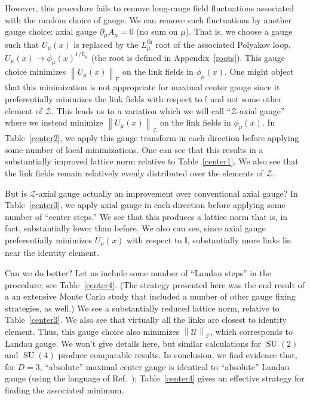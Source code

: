 \documentclass[preprint,aps,prd]{revtex4-2}
\newcommand{\zentrum}{\mathcal{Z}}       %
\newcommand{\config}{\mathcal{U}}
\DeclareMathOperator{\SU}{SU}
\newcommand\fnorm[1]{\left\lVert #1 \right\rVert_\mathrm{F}}
\begin{document}
However, this procedure fails to remove long-range field fluctuations
associated with the random choice of gauge.  We can remove
such fluctuations by another gauge choice:  axial gauge
$\partial_\mu A_\mu = 0$ (no sum on $\mu$).
That is, we choose a gauge such that $U_\mu(x)$ is replaced
by the $L_\mu^\mathrm{th}$ root of the associated Polyakov loop,
$U_\mu(x) \to \phi_\mu(x)^{1/L_\mu}$ (the root is defined in
Appendix~\ref{roots}).
This gauge choice minimizes $\fnorm{U_\mu(x)}$
on the link fields in $\phi_\mu(x)$.  One might
object that this minimization is not appropriate for maximal center gauge
since it preferentially minimizes the link fields
with respect to $\mathbb{I}$ and not some other element of $\zentrum$.
This leads us to a variation which we will call ``$\zentrum$-axial gauge''
where we instead minimize $\left\lVert U_\mu(x) \right\rVert_\zentrum$
on the link fields in $\phi_\mu(x)$.  In Table~\ref{center2},
we apply this gauge transform in each direction before applying
some number of local minimizations.  One can see that this
results in a substantially improved lattice norm relative to
Table~\ref{center1}.  We also see that the link fields
remain relatively evenly distributed over the elements of $\zentrum$.

But is $\zentrum$-axial gauge actually an improvement over
conventional axial gauge?
In Table~\ref{center3}, we apply axial gauge in each
direction before applying some number of ``center steps.''
We see that this produces a lattice norm that is, in fact,
substantially lower than before.  We also can see, since
axial gauge preferentially minimizes $U_\mu(x)$ with
respect to $\mathbb{I}$, substantially more links lie near
the identity element.

Can we do better? Let us include some number of ``Landau steps''
in the procedure; see Table~\ref{center4}.  (The strategy presented
here was the end result of a an extensive Monte Carlo study that
included a number of other gauge fixing strategies, as well.)
We see a substantially reduced lattice norm, relative to
Table~\ref{center3}.  We also see that virtually all the
links are closest to identity element.  Thus, this gauge
choice also minimizes $\fnorm{\config}$,
which corresponds to Landau gauge.
We won't give details here, but similar calculations for
$\SU(2)$ and $\SU(4)$ produce comparable results.
In conclusion, we find evidence that, for $D=3$,
``absolute'' maximal center gauge is identical to ``absolute''
Landau gauge (using the language of Ref.~\cite{maas_more_2009});
Table~\ref{center4} gives
an effective strategy for finding the associated minimum.
\end{document}
